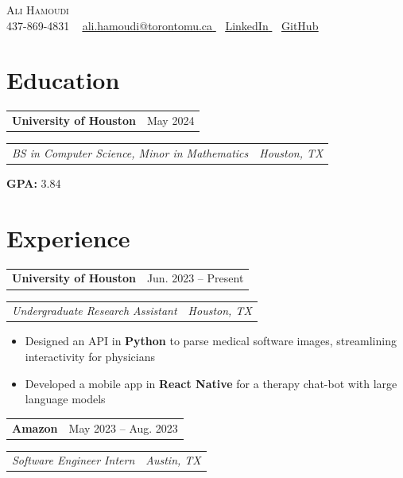 \documentclass[10pt,letterpaper]{article}
\makeatletter
\newcommand{\resumeHeading}[2]{%
    \noindent
    \begin{tabular*}{\textwidth}
        {@{}l@{\extracolsep{\fill}}r@{}}
        \textbf{#1} & #2
    \end{tabular*}%
}
\newcommand{\resumeSubheading}[2]{%
    \noindent
    \begin{tabular*}{\textwidth}
        {@{}l@{\extracolsep{\fill}}r@{}}
        \textit{#1} & \textit{#2}
    \end{tabular*}%
}
\newcommand{\resumeEntry}[4]{%
    \resumeHeading{#1}{#2}\par
    \resumeSubheading{#3}{#4}\par
}
\newcommand{\resumeBulletsStart}{%
    \begin{itemize}
}
\newcommand{\resumeBulletsEnd}{%
    \end{itemize}
}
\makeatother
\begin{document}

\begin{center}
    {\Huge \scshape Ali Hamoudi} \\ \vspace{4pt}
    \small
    \raisebox{-0.1\height}{}
    437-869-4831 ~
    \href{mailto:ali.hamoudi@torontomu.ca}{
        \raisebox{-0.2\height}{}
        \underline{ali.hamoudi@torontomu.ca}
    } ~
    \href{https://www.linkedin.com/in/ali-hamoudi-63387b33a/}{
        \raisebox{-0.2\height}{}
        \underline{LinkedIn}
    } ~
    \href{https://github.com/alitcs}{
        \raisebox{-0.2\height}{}
        \underline{GitHub}
    }
    \vspace{-8pt}
\end{center}


\section{Education}

\resumeEntry
    {University of Houston}
    {May 2024}
    {BS in Computer Science, Minor in Mathematics}
    {Houston, TX}

\hspace{1.45em}\textbf{GPA:} 3.84


\section{Experience}

\resumeEntry
    {University of Houston}
    {Jun. 2023 -- Present}
    {Undergraduate Research Assistant}
    {Houston, TX}

\resumeBulletsStart
    \item Designed an API in \textbf{Python} to parse medical software images, streamlining interactivity for physicians
    \item Developed a mobile app in \textbf{React Native} for a therapy chat-bot with large language models
\resumeBulletsEnd

\vspace{5pt}

\resumeEntry
    {Amazon}
    {May 2023 -- Aug. 2023}
    {Software Engineer Intern}
    {Austin, TX}
\end{document}

